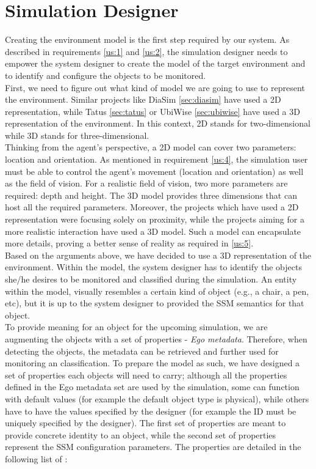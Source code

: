 \section{Simulation Designer} %
\label{sec:simulation_designer}
Creating the environment model is the first step required by our system. As described in requirements \ref{us:1} and \ref{us:2}, the simulation designer needs to empower the system designer to create the model of the target environment and to identify and configure the objects to be monitored.\\

First, we need to figure out what kind of model we are going to use to represent the environment. Similar projects like DiaSim \ref{sec:diasim} have used a 2D representation, while Tatus \ref{sec:tatus} or UbiWise \ref{sec:ubiwise} have used a 3D representation of the environment. In this context, 2D stands for two-dimensional while 3D stands for three-dimensional.\\

Thinking from the agent's perspective, a 2D model can cover two parameters: location and orientation. As mentioned in requirement \ref{us:4}, the simulation user must be able to control the agent's movement (location and orientation) as well as the field of vision. For a realistic field of vision, two more parameters are required: depth and height. The 3D model provides three dimensions that can host all the required parameters. Moreover, the projects which have used a 2D representation were focusing solely on proximity, while the projects aiming for a more realistic interaction have used a 3D model. Such a model can encapsulate more details, proving a better sense of reality as required in \ref{us:5}.\\

Based on the arguments above, we have decided to use a 3D representation of the environment. Within the model, the system designer has to identify the objects she/he desires to be monitored and classified during the simulation. An entity within the model, visually resembles a certain kind of object (e.g., a chair, a pen, etc), but it is up to the system designer to provided the SSM semantics for that object.\\

To provide meaning for an object for the upcoming simulation, we are augmenting the objects with a set of properties - \emph{Ego metadata}. Therefore, when detecting the objects, the metadata can be retrieved and further used for monitoring an classification. To prepare the model as such, we have designed a set of properties each objects will need to carry; although all the properties defined in the Ego metadata set are used by the simulation, some can function with default values (for example the default object type is physical), while others have to have the values specified by the designer (for example the ID must be uniquely specified by the designer). The first set of properties are meant to provide concrete identity to an object, while the second set of properties represent the SSM configuration parameters. The properties are detailed in the following list of :
